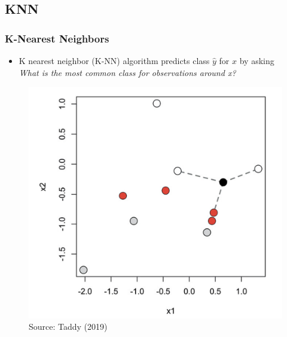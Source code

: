 \documentclass[
  shownotes,
  xcolor={svgnames},
  hyperref={colorlinks,citecolor=DarkBlue,linkcolor=andesred,urlcolor=DarkBlue}
  , aspectratio=169]{beamer}
\begin{document}
\subsection{KNN}
\begin{frame}[fragile]
\frametitle{K-Nearest Neighbors}

\begin{itemize}
\item K nearest neighbor (K-NN) algorithm predicts class $\hat y$ for $x$ by asking \\
{\it What is the most common class for observations around x?}
\end{itemize}
        \begin{figure}[H] \centering
            \captionsetup{justification=centering}
              \includegraphics[scale=0.13]{figures/knn}
              \\
              \tiny
              Source: Taddy (2019)
 \end{figure}


 \end{frame}
\end{document}

